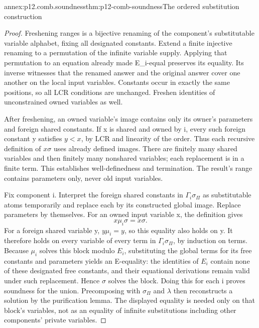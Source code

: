 \begin{annexitem}{annex:p12.comb.soundness}{thm:p12-comb-soundness}{The ordered substitution construction}
\begin{proof}
Freshening ranges is a bijective renaming of the component's
substitutable variable alphabet, fixing all designated constants.
Extend a finite injective renaming to a permutation of the infinite
variable supply. Applying that permutation to an equation already
made E_i-equal preserves its equality. Its inverse witnesses that
the renamed answer and the original answer cover one another on
the local input variables. Constants occur in exactly the same
positions, so all LCR conditions are unchanged. Freshen identities
of unconstrained owned variables as well.

After freshening, an owned variable's image contains only its owner's
parameters and foreign shared constants. If x is shared and owned by i,
every such foreign constant y satisfies \(y<x\), by LCR and linearity
of the order. Thus each recursive definition of \(x\sigma\) uses
already defined images. There are finitely many shared variables and
then finitely many nonshared variables; each replacement is in a
finite term. This establishes well-definedness and termination.
The result's range contains parameters only, never old input variables.

Fix component i. Interpret the foreign shared constants in
\(\Gamma_i\sigma_\Pi\) as substitutable atoms temporarily and
replace each by its constructed global image. Replace parameters
by themselves. For an owned input variable x, the definition gives
\[
                   x\mu_i\sigma=x\sigma.
\]
For a foreign shared variable y, \(y\mu_i=y\), so this equality
also holds on y. It therefore holds on every variable of every
term in \(\Gamma_i\sigma_\Pi\), by induction on terms.
Because \(\mu_i\) solves this block modulo \(E_i\), substituting
the global terms for its free constants and parameters yields an
E-equality: the identities of \(E_i\) contain none of these
designated free constants, and their equational derivations remain
valid under such replacement. Hence \(\sigma\) solves the block.
Doing this for each i proves soundness for the union. Precomposing
with \(\sigma_\Pi\) and \(\lambda\) then reconstructs a solution
by the purification lemma. The displayed equality is needed only
on that block's variables, not as an equality of infinite substitutions
including other components' private variables.
\end{proof}
\end{annexitem}

